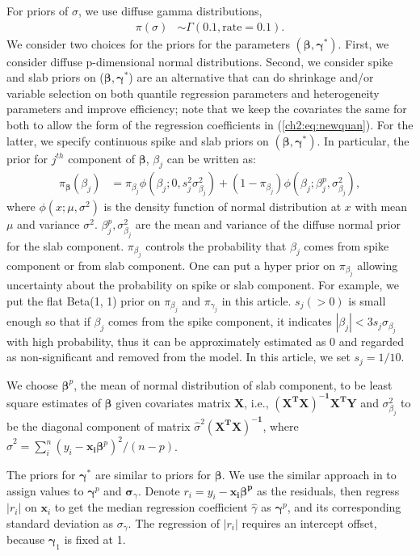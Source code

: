 \documentclass[12pt]{article}
\begin{document}
For priors of $\sigma$, we use diffuse gamma distributions,
\begin{align*}
  \pi(\sigma) & \sim \Gamma(0.1, \mbox{rate} = 0.1).
\end{align*}
We consider two choices for the priors for the parameters
$(\bm{\beta}, \bm{\gamma}^{*})$.  First, we consider diffuse p-dimensional
normal distributions.  Second, we consider spike and slab priors on
($\bm \beta, \bm \gamma^{*}$) are an alternative that can do shrinkage
and/or variable selection on both quantile regression parameters and
heterogeneity parameters and improve efficiency; note that we keep the
covariates the same for both to allow the form of the regression
coefficients in (\ref{ch2:eq:newquan}).  For the latter, we specify
continuous spike and slab priors \citep{george1993}
on $(\bm \beta, \bm \gamma^{*})$.
In particular, the prior for $j^{th}$ component of $\bm \beta$, $\beta_j$ can be written as:
\begin{align*}
  \pi_{\bm \beta} (\beta_j) &= \pi_{\beta_j} \phi(\beta_j; 0, s_j^2 \sigma_{\beta_j}^2) + (1- \pi_{\beta_j}) \phi(\beta_j; \beta_j^p, \sigma_{\beta_j}^2),
\end{align*}
where $\phi(x; \mu, \sigma^2)$ is the density function of normal distribution at $x$ with mean $\mu$ and variance $\sigma^2$.
$\beta_j^p, \sigma_{\beta_j}^2$ are the mean and variance of the diffuse normal prior for the slab component.
$\pi_{\beta_j}$ controls the probability that $\beta_j$ comes from spike component or from slab component.
One can put a hyper prior on $\pi_{\beta_j}$ allowing uncertainty about the probability on spike or slab component.
For example, we put the flat Beta(1, 1) prior on  $\pi_{\beta_j}$ and $\pi_{\gamma_j}$ in this article.
$s_j (>0)$ is small enough so that if $\beta_j$ comes from the spike component, it indicates $|\beta_j | < 3 s_j\sigma_{\beta_j}$ with high probability,
thus it can be approximately estimated as 0 and regarded as non-significant and removed from the model.
In this article, we set $s_j = 1/10$.

We choose $\bm \beta^p$, the mean of normal distribution of slab component,
to be least square estimates of $\bm \beta$ given covariates matrix $\bm X$,
i.e., $\bm{(X^TX)^{-1}X^TY}$ and $\sigma_{\beta_j}^2$ to be the diagonal component of matrix $\hat{\sigma}^2 \bm{(X^TX)^{-1}}$,
where $\hat{\sigma}^2 = \sum_i^n (y_i - \bm{x_i\beta}^p)^2/(n - p)$.

The priors for $\bm \gamma^{*}$ are similar to priors for $\bm \beta$.
We use the similar approach in \citet{he1998} to assign values to $\bm \gamma^p$ and $\bm \sigma_{\gamma}$.
Denote $r_i = y_i - \bm{x_i\beta^p}$ as the residuals, then regress $|r_i|$ on $\bm x_i$ to get the median regression coefficient $\hat{\gamma}$ as $\bm \gamma^p$, and its corresponding standard deviation as $\sigma_{\gamma}$.
The regression of $|r_i|$ requires an intercept offset, because $\bm \gamma_1$ is fixed at 1.
\end{document}
